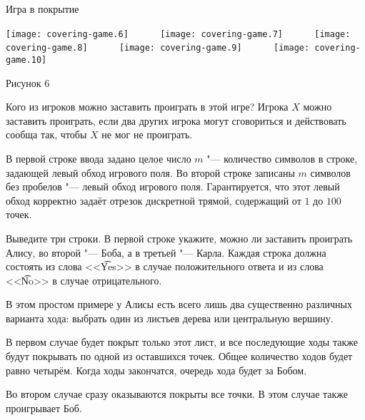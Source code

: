 \begin{problem}{Игра в покрытие}
\begin{center}
\texttt{[image: covering-game.6]}
~~~~~
\texttt{[image: covering-game.7]}
~~~~~
\texttt{[image: covering-game.8]}
~~~~~
\texttt{[image: covering-game.9]}
~~~~~
\texttt{[image: covering-game.10]}

Рисунок 6
\end{center}

Кого из игроков можно заставить проиграть в этой игре?
Игрока $X$ можно заставить проиграть, если два других игрока могут
сговориться и действовать сообща так, чтобы $X$ не мог не проиграть.

\InputFile

В первой строке ввода задано целое число $m$ "--- количество символов
в строке, задающей левый обход игрового поля.
Во второй строке записаны $m$ символов без пробелов "--- левый обход
игрового поля.
Гарантируется, что этот левый обход корректно задаёт отрезок дискретной трямой,
содержащий от $1$ до $100$ точек.

\OutputFile

Выведите три строки.
В первой строке укажите, можно ли заставить проиграть Алису,
во второй "--- Боба, а в третьей "--- Карла.
Каждая строка должна состоять из слова <<\t{Yes}>> в случае положительного
ответа и из слова <<\t{No}>> в случае отрицательного.

\Example

\begin{examplethree}
%
\end{examplethree}

\Explanation

В этом простом примере у Алисы есть всего лишь два существенно различных
варианта хода: выбрать один из листьев дерева или центральную вершину.

В первом случае будет покрыт только этот лист, и все последующие ходы
также будут покрывать по одной из оставшихся точек.
Общее количество ходов будет равно четырём.
Когда ходы закончатся, очередь хода будет за Бобом.

Во втором случае сразу оказываются покрыты все точки.
В этом случае также проигрывает Боб.

\end{problem}
